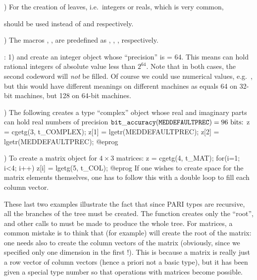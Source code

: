 ) For the creation of leaves, i.e.~integers or reals, which is
very common,



\noindent should be used instead of  and
 respectively.

) The macros , ,  are
predefined as , , ,
respectively.

: 1)  and
 create an integer object whose ``precision''
is  = 64. This means  can hold rational
integers of absolute value less than $2^{64}$. Note that in both cases, the
second codeword will \emph{not} be filled. Of course we could use numerical
values, e.g.~, but this would have different meanings on
different machines as  equals 64 on 32-bit machines,
but 128 on 64-bit machines.

) The following creates a type ``complex'' object whose real and
imaginary parts can hold real numbers of precision
${\tt bit\_accuracy(MEDDEFAULTPREC)} = 96\hbox{ bits:}$
%
\bprog
  z = cgetg(3, t_COMPLEX);
  z[1] = lgetr(MEDDEFAULTPREC);
  z[2] = lgetr(MEDDEFAULTPREC);
@eprog

) To create a matrix object for $4\times 3$ matrices:
%
\bprog
  z = cgetg(4, t_MAT);
  for(i=1; i<4; i++) z[i] = lgetg(5, t_COL);
@eprog
%
\noindent If one wishes to create space for the matrix elements themselves,
one has to follow this with a double loop to fill each column vector.

These last two examples illustrate the fact that since PARI types are
recursive, all the branches of the tree must be created. The function
 creates only the ``root'', and other calls to  must be
made to produce the whole tree.  For matrices, a common mistake is to think
that  (for example) will create the root of the
matrix: one needs also to create the column vectors of the matrix (obviously,
since we specified only one dimension in the first !). This is
because a matrix is really just a row vector of column vectors (hence a
priori not a basic type), but it has been given a special type number so that
operations with matrices become possible.

